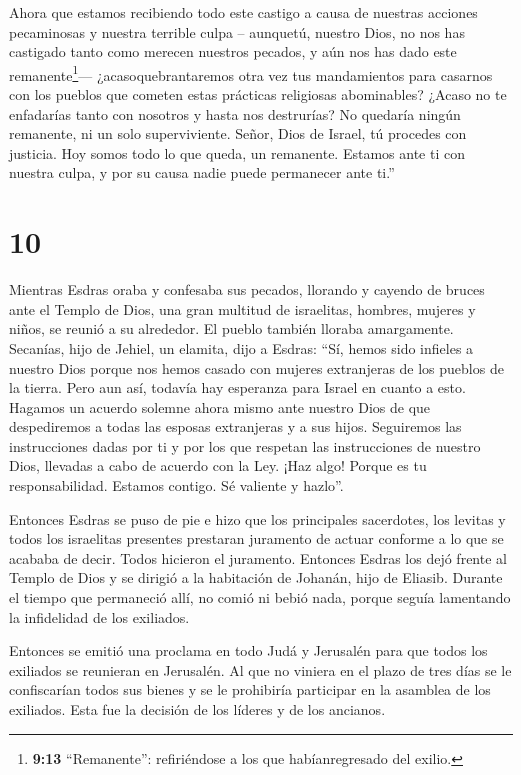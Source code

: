  Ahora que estamos recibiendo todo este castigo a causa de
nuestras acciones pecaminosas y nuestra terrible culpa -- aunquetú,
nuestro Dios, no nos has castigado tanto como merecen nuestros pecados,
y aún nos has dado este remanente\footnote{\textbf{9:13} ``Remanente'':
  refiriéndose a los que habíanregresado del exilio.}--- 
¿acasoquebrantaremos otra vez tus mandamientos para casarnos con los
pueblos que cometen estas prácticas religiosas abominables? ¿Acaso no te
enfadarías tanto con nosotros y hasta nos destrurías? No quedaría ningún
remanente, ni un solo superviviente.  Señor, Dios de
Israel, tú procedes con justicia. Hoy somos todo lo que queda, un
remanente. Estamos ante ti con nuestra culpa, y por su causa nadie puede
permanecer ante ti.''

\hypertarget{section-9}{%
\section{10}\label{section-9}}

 Mientras Esdras oraba y confesaba sus pecados, llorando y
cayendo de bruces ante el Templo de Dios, una gran multitud de
israelitas, hombres, mujeres y niños, se reunió a su alrededor. El
pueblo también lloraba amargamente.  Secanías, hijo de
Jehiel, un elamita, dijo a Esdras: ``Sí, hemos sido infieles a nuestro
Dios porque nos hemos casado con mujeres extranjeras de los pueblos de
la tierra. Pero aun así, todavía hay esperanza para Israel en cuanto a
esto.  Hagamos un acuerdo solemne ahora mismo ante nuestro
Dios de que despediremos a todas las esposas extranjeras y a sus hijos.
Seguiremos las instrucciones dadas por ti y por los que respetan las
instrucciones de nuestro Dios, llevadas a cabo de acuerdo con la Ley.
 ¡Haz algo! Porque es tu responsabilidad. Estamos contigo.
Sé valiente y hazlo''.

 Entonces Esdras se puso de pie e hizo que los principales
sacerdotes, los levitas y todos los israelitas presentes prestaran
juramento de actuar conforme a lo que se acababa de decir. Todos
hicieron el juramento.  Entonces Esdras los dejó frente al
Templo de Dios y se dirigió a la habitación de Johanán, hijo de Eliasib.
Durante el tiempo que permaneció allí, no comió ni bebió nada, porque
seguía lamentando la infidelidad de los exiliados.

 Entonces se emitió una proclama en todo Judá y Jerusalén
para que todos los exiliados se reunieran en Jerusalén.  Al
que no viniera en el plazo de tres días se le confiscarían todos sus
bienes y se le prohibiría participar en la asamblea de los exiliados.
Esta fue la decisión de los líderes y de los ancianos.

